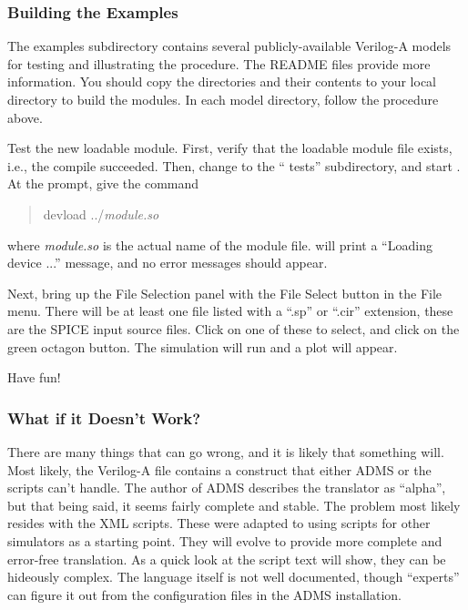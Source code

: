 \subsubsection{Building the Examples}

The {\vt examples} subdirectory contains several publicly-available
Verilog-A models for testing and illustrating the procedure.  The {\vt
README} files provide more information.  You should copy the
directories and their contents to your local directory to build the
modules.  In each model directory, follow the procedure above.

Test the new loadable module.  First, verify that the loadable module
file exists, i.e., the compile succeeded.  Then, change to the ``{\vt
tests}'' subdirectory, and start {\WRspice}.  At the {\WRspice}
prompt, give the command
\begin{quote}
{\vt devload ../}{\it module.so}
\end{quote}
where {\it module.so} is the actual name of the module file. 
{\WRspice} will print a ``{\vt Loading device} ...'' message, and no
error messages should appear.

Next, bring up the {\cb File Selection} panel with the {\cb File
Select} button in the {\cb File} menu.  There will be at least one
file listed with a ``{\vt .sp}'' or ``{\vt .cir}'' extension, these
are the SPICE input source files.  Click on one of these to select,
and click on the green octagon button.  The simulation will run and a
plot will appear.

Have fun!

\subsubsection{What if it Doesn't Work?}

There are many things that can go wrong, and it is likely that
something will.  Most likely, the Verilog-A file contains a construct
that either ADMS or the scripts can't handle.  The author of ADMS
describes the translator as ``alpha'', but that being said, it seems
fairly complete and stable.  The problem most likely resides with the
XML scripts.  These were adapted to {\WRspice} using scripts for other
simulators as a starting point.  They will evolve to provide more
complete and error-free translation.  As a quick look at the script
text will show, they can be hideously complex.  The language itself is
not well documented, though ``experts'' can figure it out from the
configuration files in the ADMS installation.


